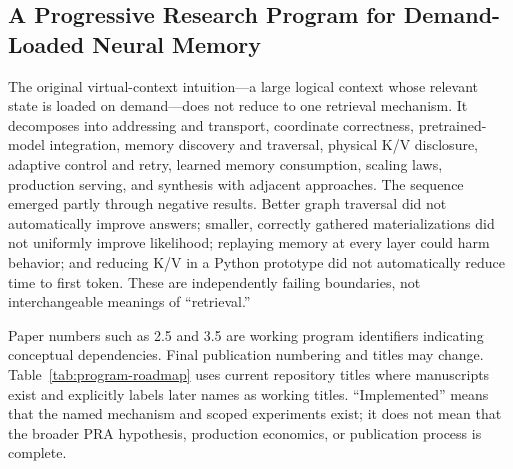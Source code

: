 \documentclass[11pt]{article}
\begin{document}
\subsection{A Progressive Research Program for Demand-Loaded Neural Memory}
\label{sec:program-roadmap}

The original virtual-context intuition---a large logical context whose relevant state is loaded on
demand---does not reduce to one retrieval mechanism.  It decomposes into addressing and transport,
coordinate correctness, pretrained-model integration, memory discovery and traversal, physical
K/V disclosure, adaptive control and retry, learned memory consumption, scaling laws, production
serving, and synthesis with adjacent approaches.  The sequence emerged partly through negative
results.  Better graph traversal did not automatically improve answers; smaller, correctly gathered
materializations did not uniformly improve likelihood; replaying memory at every layer could harm
behavior; and reducing K/V in a Python prototype did not automatically reduce time to first token.
These are independently failing boundaries, not interchangeable meanings of ``retrieval.''

Paper numbers such as 2.5 and 3.5 are working program identifiers indicating conceptual
dependencies. Final publication numbering and titles may change.  Table~\ref{tab:program-roadmap}
uses current repository titles where manuscripts exist and explicitly labels later names as working
titles.  ``Implemented'' means that the named mechanism and scoped experiments exist; it does not
mean that the broader PRA hypothesis, production economics, or publication process is complete.
\end{document}
